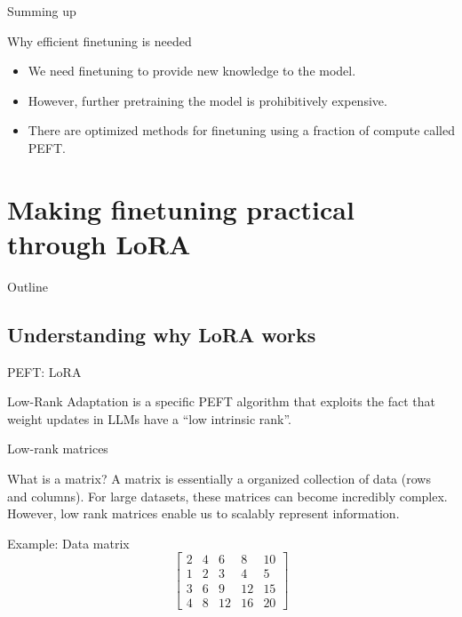 \documentclass[24pt]{beamer}
\newcommand{\sectionslide}{
	\begin{frame}{Outline}
		\tableofcontents[currentsection]
	\end{frame}
}
\newcommand{\subsectionslide}{
	\begin{frame}
		\sectionpage
		\subsectionpage
	\end{frame}
}
\begin{document}
\begin{frame}{Summing up}
	\begin{block}{Why efficient finetuning is needed}
		\begin{itemize}
			\item We need finetuning to provide new knowledge to the model.
			\item However, further pretraining the model is prohibitively expensive.
			\item There are optimized methods for finetuning using a fraction of compute called PEFT.
		\end{itemize}
	\end{block}
\end{frame}

\section{Making finetuning practical through LoRA}
\sectionslide

\subsection{Understanding why LoRA works}
\subsectionslide

\begin{frame}{PEFT: LoRA}
    \begin{definition}[LoRA]
    	Low-Rank Adaptation is a specific PEFT
    	algorithm that exploits the fact that weight updates in LLMs have a
    	\alert{``low intrinsic rank''}.
    \end{definition}
\end{frame}

\begin{frame}{Low-rank matrices}
    \begin{block}{What is a matrix?}
        A matrix is essentially a organized collection of data (rows and
        columns). For large datasets, these matrices can become incredibly
        complex. However, low rank matrices enable us to \alert{scalably} represent
        information.
    \end{block}

    \begin{exampleblock}{Example: Data matrix}
        \[
        \begin{bmatrix}
            2 & 4 & 6 & 8 & 10\\
            1 & 2 & 3 & 4 & 5\\
            3 & 6 & 9 & 12 & 15\\
            4 & 8 & 12 & 16 & 20
        \end{bmatrix}
        \]
    \end{exampleblock}
\end{frame}
\end{document}
